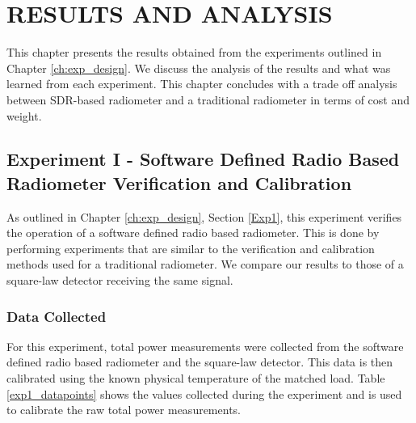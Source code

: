 


\chapter{RESULTS AND ANALYSIS}\label{ch:results}
This chapter presents the results obtained from the experiments outlined in Chapter \ref{ch:exp_design}.  We discuss the analysis of the results and what was learned from each experiment.  This chapter concludes with a trade off analysis between SDR-based radiometer and a traditional radiometer in terms of cost and weight.

\section{Experiment I - Software Defined Radio Based Radiometer Verification and Calibration} \label{Exp1_results}
As outlined in Chapter \ref{ch:exp_design}, Section \ref{Exp1}, this experiment verifies the operation of a software defined radio based radiometer.  This is done by performing experiments that are similar to the verification and calibration methods used for a traditional radiometer.  We compare our results to those of a square-law detector receiving the same signal.

\subsection{Data Collected}\label{Exp1_data}

For this experiment, total power measurements were collected from the software defined radio based radiometer and the square-law detector.  This data is then calibrated using the known physical temperature of the matched load.  Table \ref{exp1_datapoints} shows the values collected during the experiment and is used to calibrate the raw total power measurements.

